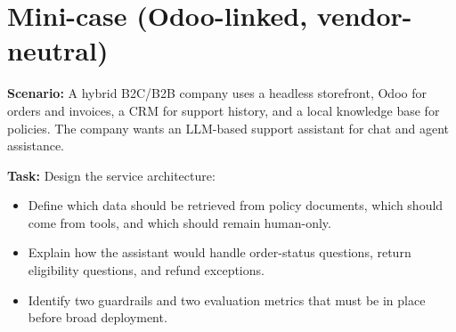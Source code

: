 \section{Mini-case (Odoo-linked, vendor-neutral)}
\textbf{Scenario:} A hybrid B2C/B2B company uses a headless storefront, Odoo for orders and invoices, a CRM for support history, and a local knowledge base for policies. The company wants an LLM-based support assistant for chat and agent assistance.

\textbf{Task:} Design the service architecture:
\begin{itemize}
  \item Define which data should be retrieved from policy documents, which should come from tools, and which should remain human-only.
  \item Explain how the assistant would handle order-status questions, return eligibility questions, and refund exceptions.
  \item Identify two guardrails and two evaluation metrics that must be in place before broad deployment.
\end{itemize}
